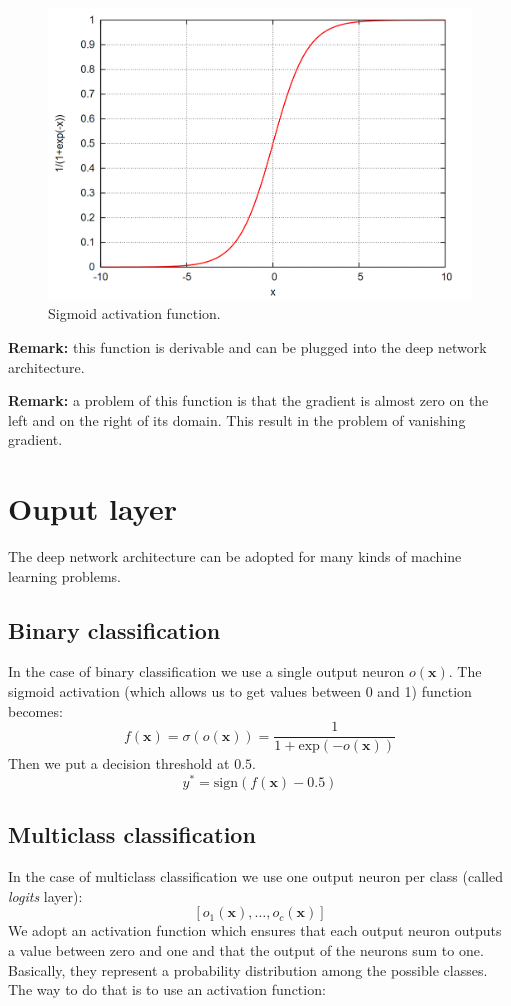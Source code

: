 \begin{figure}
    \centering
    \includegraphics[scale=0.2]{images/sigmoid.png}
    \caption{Sigmoid activation function.}
    \label{fig:sigmoid}
\end{figure}

\textbf{Remark:} this function is derivable and can be plugged into the deep network architecture. \newline

\textbf{Remark:} a problem of this function is that the gradient is almost zero on the left and on the right of its domain. This result in the problem of vanishing gradient. \newline

\section{Ouput layer}
The deep network architecture can be adopted for many kinds of machine learning problems. \newline

\subsection{Binary classification}
In the case of binary classification we use a single output neuron $o(\pmb{x})$. The sigmoid activation (which allows us to get values between 0 and 1) function becomes:
$$f(\pmb{x}) = \sigma(o(\pmb{x})) = \frac{1}{1+\text{exp}(-o(\pmb{x}))}$$
Then we put a decision threshold at $0.5$.
$$y^* = \text{sign}(f(\pmb{x}) - 0.5)$$

\subsection{Multiclass classification}
In the case of multiclass classification we use one output neuron per class (called \textit{logits} layer):
$$[o_1(\pmb{x}), \hdots, o_c(\pmb{x})]$$
We adopt an activation function which ensures that each output neuron outputs a value between zero and one and that the output of the neurons sum to one. Basically, they represent a probability distribution among the possible classes. The way to do that is to use an activation function:

